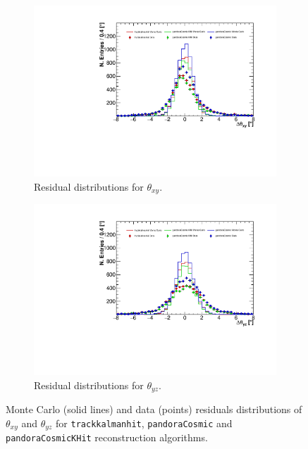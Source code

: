 \documentclass[a4paper]{scrartcl}
\begin{document}
\begin{figure}[htbp]
\begin{subfigure}{0.52\textwidth}
\includegraphics[width=\linewidth]{xy_res.pdf}
\caption{Residual distributions for $\theta_{xy}$.} \label{fig:res_xy}
\end{subfigure}
\hspace*{\fill}
\begin{subfigure}{0.52\textwidth}
\includegraphics[width=\linewidth]{yz_res.pdf}
\caption{Residual distributions for $\theta_{yz}$.} \label{fig:res_yz}
\end{subfigure}
\caption{Monte Carlo (solid lines) and data (points) residuals distributions of $\theta_{xy}$ and $\theta_{yz}$ for \texttt{track\-kal\-man\-hit}, \texttt{pan\-do\-ra\-Co\-smic} and \texttt{pan\-do\-ra\-Co\-smicKHit} reconstruction algorithms.} \label{fig:res}
\end{figure}
\end{document}
